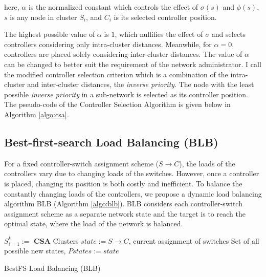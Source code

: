 \documentclass{IEEEtran}
\begin{document}
	here, $\alpha$ is the normalized constant which controls the effect of $\sigma(s)$ and $\phi(s)$, $s$ is any node in cluster $S_i$, and $C_i$ is its selected controller position.
	
	The highest possible value of $\alpha$ is $1$, which nullifies the effect of $\sigma$ and selects controllers considering only intra-cluster distances. Meanwhile, for $\alpha = 0$, controllers are placed solely considering inter-cluster distances. The value of $\alpha$ can be changed to better suit the requirement of the network administrator. I call the modified controller selection criterion which is a combination of the intra-cluster and inter-cluster distances, the \textit{inverse priority}. The node with the least possible \textit{inverse priority} in a sub-network is selected as its controller position. The pseudo-code of the Controller Selection Algorithm is given below in Algorithm \ref{algo:csa}.
	

	\subsection{Best-first-search Load Balancing (BLB)} \label{blb}
	
	For a fixed controller-switch assignment scheme ($S\rightarrow C$), the loads of the controllers vary due to changing loads of the switches. However, once a controller is placed, changing its position is both costly and inefficient. To balance the constantly changing loads of the controllers, we propose a dynamic load balancing algorithm BLB (Algorithm \ref{algo:blb}). BLB considers each controller-switch assignment scheme as a separate network state and the target is to reach the optimal state, where the load of the network is balanced.
	
	\begin{algorithm}
		\SetAlgoLined
		$S_{i=1}^k := $ \textbf{CSA} Clusters\;
		$state := S \rightarrow C$, current assignment of switches\;
		Set of all possible new states, $Pstates := {state}$\;
		\caption{BestFS Load Balancing (BLB)} \label{algo:blb}
	\end{algorithm}
	
\end{document}
